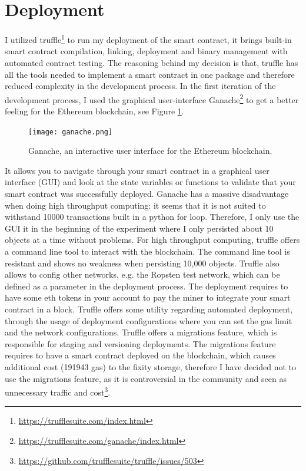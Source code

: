 \documentclass[final]{vutinfth}
\begin{document}
\section{Deployment}
I utilized truffle\footnote{\url{https://trufflesuite.com/index.html}} to run my deployment of the smart contract, it brings built-in smart contract compilation, linking, deployment and binary management with automated contract testing. The reasoning behind my decision is that, truffle has all the tools needed to implement a smart contract in one package and therefore reduced complexity in the development process. In the first iteration of the development process, I used the graphical user-interface Ganache\footnote{\url{https://trufflesuite.com/ganache/index.html}} to get a better feeling for the Ethereum blockchain, see Figure \ref{fig:ganache}.
\begin{figure}[t]
  \centering
  \texttt{[image: ganache.png]}
  \caption{Ganache, an interactive user interface for the Ethereum blockchain.}
  \label{fig:ganache}
\end{figure}
It allows you to navigate through your smart contract in a graphical user interface (GUI) and look at the state variables or functions to validate that your smart contract was successfully deployed. Ganache has a massive disadvantage when doing high throughput computing: it seems that it is not suited to withstand 10000 transactions built in a python for loop. Therefore, I only use the GUI it in the beginning of the experiment where I only persisted about 10 objects at a time without problems. For high throughput computing, truffle offers a command line tool to interact with the blockchain. The command line tool is resistant and shows no weakness when persisting 10,000 objects.
Truffle also allows to config other networks, e.g. the Ropsten test network, which can be defined as a parameter in the deployment process. The deployment requires to have some \acrlong{eth} tokens in your account to pay the miner to integrate your smart contract in a block. 
Truffle offers some utility regarding automated deployment, through the usage of deployment configurations where you can set the gas limit and the network configurations. Truffle offers a migrations feature, which is responsible for staging and versioning deployments. The migrations feature requires to have a smart contract deployed on the blockchain, which causes additional cost (191943 gas) to the fixity storage, therefore I have decided not to use the migrations feature, as it is controversial in the community and seen as unnecessary traffic and cost\footnote{\url{https://github.com/trufflesuite/truffle/issues/503}}.
\end{document}
